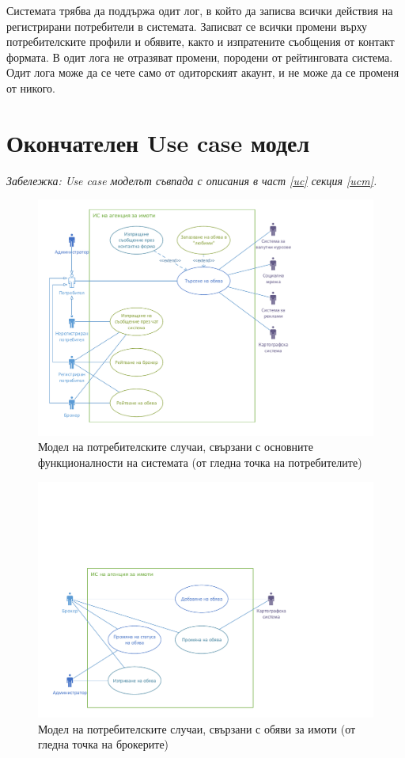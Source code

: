 \documentclass[a4paper]{article}
\begin{document}
Системата трябва да поддържа одит лог, в който да записва всички действия на регистрирани потребители в системата. 
Записват се всички промени върху потребителските профили и обявите, както и изпратените съобщения от контакт формата.
В одит лога не отразяват промени, породени от рейтинговата система. Одит лога може да се чете само от одиторският акаунт, и не може да се променя от никого.

\clearpage
\section{Окончателен Use case модел}

\emph{Забележка: Use case моделът съвпада с описания в част \ref{uc} секция \ref{ucm}.} \\

        \begin{figure}[h]
        \centering
        \includegraphics[scale=1]{uc2a}
        \caption{Модел на потребителските случаи, свързани с основните функционалности на системата (от гледна точка на потребителите)}
        \end{figure}

\clearpage

        \begin{figure}[h]
        \centering
        \includegraphics[scale=1]{uc2b}
        \caption{Модел на потребителските случаи, свързани с обяви за имоти (от гледна точка на брокерите)}
        \end{figure}
\end{document}
